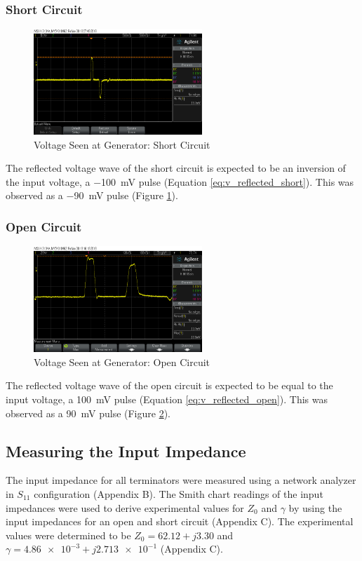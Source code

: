\documentclass[conference]{IEEEtran}
\begin{document}
\subsubsection{Short Circuit}
\begin{figure}[H]
  \centering
  \includegraphics[width=2.5in]{./img/short.png}
  \caption{Voltage Seen at Generator: Short Circuit}
  \label{fig:short}
\end{figure}

The reflected voltage wave of the short circuit is expected to be an inversion of the input voltage,
a \SI{-100}{\milli\volt} pulse (Equation \ref{eq:v_reflected_short}). This was
observed as a \SI{-90}{\milli\volt} pulse (Figure \ref{fig:short}).

\subsubsection{Open Circuit}
\begin{figure}[H]
  \centering
  \includegraphics[width=2.5in]{./img/open.png}
  \caption{Voltage Seen at Generator: Open Circuit}
  \label{fig:open}
\end{figure}

The reflected voltage wave of the open circuit is expected to be equal to the input voltage,
a \SI{100}{\milli\volt} pulse (Equation \ref{eq:v_reflected_open}). This was
observed as a \SI{90}{\milli\volt} pulse (Figure \ref{fig:open}).

\subsection{Measuring the Input Impedance}
The input impedance for all terminators were measured using a network analyzer
in $S_{11}$ configuration (Appendix B). The Smith chart readings of the input
impedances were used to derive experimental values for $Z_0$ and $\gamma$ by
using the input impedances for an open and short circuit (Appendix C). The
experimental values were determined to be $Z_0 = 62.12 + j3.30$ and $\gamma =
\num{4.86e-3} + j\num{2.713e-1}$ (Appendix C).
\end{document}
